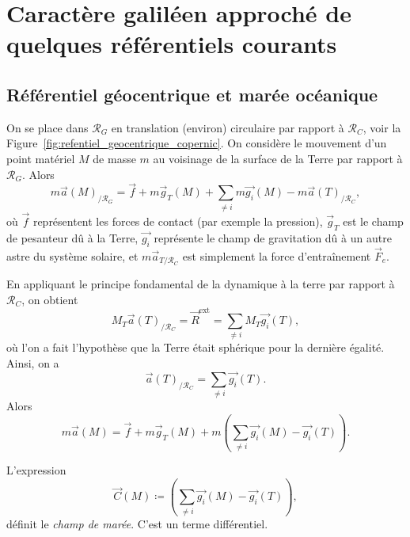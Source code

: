\section[Caractère galiléen de certains référentiels]{Caractère galiléen approché de quelques référentiels courants}

    \subsection{Référentiel géocentrique et marée océanique}

        On se place dans $\mathcal{R}_{G}$ en translation (environ) circulaire par rapport à $\mathcal{R}_{C}$, voir la Figure~\ref{fig:refentiel_geocentrique_copernic}. On considère le mouvement d'un point matériel $M$ de masse $m$ au voisinage de la surface de la Terre par rapport à $\mathcal{R}_{G}$. Alors 
        \begin{equation}
            m\vec{a}(M)_{/\mathcal{R}_{G}}=\vec{f}+m\vec{g}_{T}(M)+\sum_{\neq i}m\vec{g_i}(M)-m\vec{a}(T)_{/\mathcal{R}_C},
        \end{equation}
        où $\vec{f}$ représentent les forces de contact (par exemple la pression), $\vec{g}_{T}$ est le champ de pesanteur dû à la Terre, $\vec{g_i}$ représente le champ de gravitation dû à un autre astre du système solaire, et $m\vec{a}_{T/\mathcal{R}_{C}}$ est simplement la force d'entraînement $\vec{F}_{e}$.

        En appliquant le principe fondamental de la dynamique à la terre par rapport à $\mathcal{R}_{C}$, on obtient 
        \begin{equation}
            M_{T}\vec{a}(T)_{/\mathcal{R}_{C}}=\vec{R}^{\text{ext}}=\sum_{\neq i}M_T\vec{g_i}(T),
        \end{equation}
        où l'on a fait l'hypothèse que la Terre était sphérique pour la dernière égalité. Ainsi, on a 
        \begin{equation}
            \vec{a}(T)_{/\mathcal{R}_C}=\sum_{\neq i}\vec{g_i}(T).
        \end{equation}
        Alors 
        \begin{equation}
            \boxed{m\vec{a}(M)=\vec{f}+m\vec{g}_{T}(M)+m\left(\sum_{\neq i}\vec{g_i}(M)-\vec{g_i}(T)\right).}
        \end{equation}

        \begin{definition}
            L'expression
            \begin{equation}
                \vec{C}(M)\coloneqq\left(\sum_{\neq i}\vec{g_i}(M)-\vec{g_i}(T)\right),
            \end{equation}
            définit le \textit{champ de marée}. C'est un terme différentiel.
        \end{definition}

